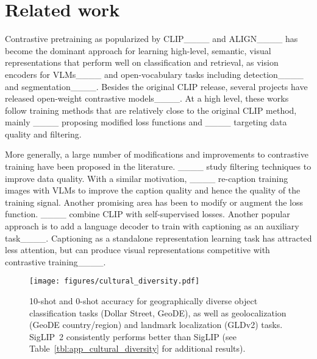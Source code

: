 \section{Related work}
\label{sec:related}

Contrastive pretraining as popularized by CLIP____ and ALIGN____ has become the dominant approach for learning high-level, semantic, visual representations that perform well on classification and retrieval, as vision encoders for VLMs____ and open-vocabulary tasks including detection____ and segmentation____. Besides the original CLIP release, several projects have released open-weight contrastive models____. At a high level, these works follow training methods that are relatively close to the original CLIP method, mainly ____ proposing modified loss functions and ____ targeting data quality and filtering.


More generally, a large number of modifications and improvements  to contrastive training have been proposed in the literature. ____ study filtering techniques to improve data quality. With a similar motivation, ____ re-caption training images with VLMs to improve the caption quality and hence the quality of the training signal. Another promising area has been to modify or augment the loss function. ____ combine CLIP with self-supervised losses. Another popular approach is to add a language decoder to train with captioning as an auxiliary task____. Captioning as a standalone representation learning task has attracted less attention, but can produce visual representations competitive with contrastive training____.

\begin{figure}[t]
    \centering
    \texttt{[image: figures/cultural\_diversity.pdf]}
    \caption{10-shot and 0-shot accuracy for geographically diverse object classification tasks (Dollar Street, GeoDE), as well as geolocalization (GeoDE country/region) and landmark localization (GLDv2) tasks. SigLIP~2 consistently performs better than SigLIP (see Table~\ref{tbl:app_cultural_diversity} for additional results).}
    \label{fig:cultural_diversity}
\end{figure}